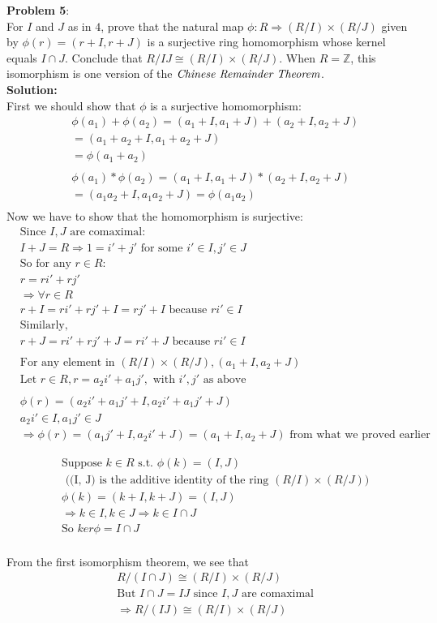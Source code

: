 \documentclass[11pt]{article}
\newcommand{\prob}[3]{\begin{flushleft}
        \textbf{Problem #1}: \\
        #2 
		\textbf{Solution:} 
		#3

\end{flushleft}}
\newcommand{\B}[1]{%
	\mathbb{#1}
}
\begin{document}
\prob{5}{
For $I$ and $J$ as in $4$, prove that the natural map $\phi: R \Rightarrow (R/I) \times (R/J)$ given by $\phi (r) = (r + I, r + J)$ is a surjective ring homomorphism whose kernel equals $I \cap J$. Conclude that $R/IJ \cong (R/I) \times (R/J)$. When $R = \B{Z}$, this isomorphism is one version of the $\emph{Chinese Remainder Theorem}$.
\\
}
{\\
First we should show that $\phi$ is a surjective homomorphism:
\begin{align*}
&\phi(a_1) + \phi(a_2) = (a_1 + I, a_1 + J) + (a_2 + I, a_2 + J)\\
& = (a_1 + a_2 + I, a_1 + a_2 + J)\\
& = \phi(a_1+a_2)\\
&\\
&\phi(a_1)*\phi(a_2) = (a_1 + I, a_1 + J)*(a_2 + I, a_2 + J)\\
& = (a_1a_2 + I, a_1a_2 + J) = \phi(a_1a_2)\\
\end{align*}
Now we have to show that the homomorphism is surjective:
\begin{align*}
&\text{Since $I, J $ are comaximal:}\\
&I + J = R \Rightarrow 1 = i' + j' \text{ for some $i' \in I, j' \in J$}\\
&\text{So for any $r \in R$}:\\
&r = ri' + rj'\\
&\Rightarrow \forall r \in R\\
&r + I = ri' + rj' + I = rj' + I \text{ because $ri' \in I$}\\
&\text{Similarly,}\\
&r + J = ri' + rj' + J = ri' + J \text{ because $ri' \in I$}\\
&\\
&\text{For any element in } (R / I) \times (R /J ), (a_1 + I, a_2 + J)\\
&\text{Let } r \in R, r = a_2i' + a_1j', \text{ with $i', j'$ as above}\\
&\\
&\phi(r) = (a_2i' + a_1j' + I, a_2i' + a_1j' + J)\\
&a_2i' \in I, a_1j' \in J\\
&\Rightarrow \phi(r) = (a_1j' + I, a_2i' + J) = (a_1 + I, a_2 + J) \text{ from what we proved earlier}
\end{align*}

\begin{align*}
&\text{Suppose } k \in R \text{ s.t. } \phi(k) = (I, J) \\
&\text{ ((I, J) is the additive identity of the ring $(R/I) \times (R/J)$)}\\
&\phi(k) = (k + I, k + J) = (I, J)\\
&\Rightarrow k \in I, k \in J \Rightarrow k \in I \cap J\\
&\text{So } ker \phi = I \cap J\\
\end{align*}

From the first isomorphism theorem, we see that
\begin{align*}
&R/(I\cap J) \cong (R/I) \times (R/J)\\
&\text{But } I \cap J = IJ \text{ since $I, J$ are comaximal}\\
&\Rightarrow R/(IJ) \cong (R/I) \times (R/J)
\end{align*}

}
\end{document}
